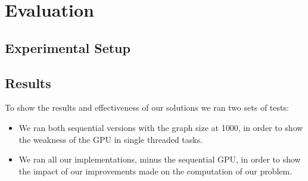 \documentclass[conference]{IEEEtran}
\begin{document}
\section{Evaluation}

\subsection{Experimental Setup}


\subsection{Results}

To show the results and effectiveness of our solutions we ran two sets of tests:
\begin{itemize}
	\item We ran both sequential versions with the graph size at 1000, in order to show the weakness of the GPU in single threaded tasks.
	\item We ran all our implementations, minus the sequential GPU, in order to show the impact of our improvements made on the computation of our problem.
\end{itemize}

\end{document}
